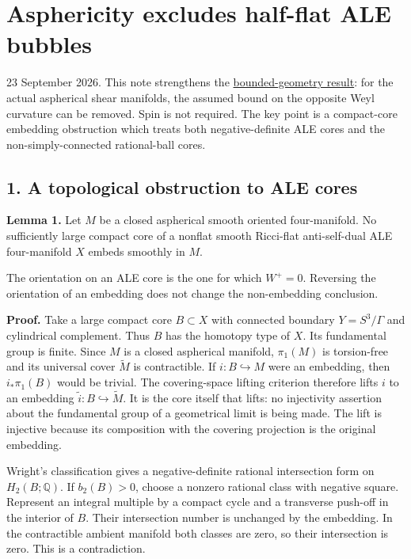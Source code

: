 \documentclass[
  11pt,
]{article}
\author{}
\date{23 September 2026}
\begin{document}
\hypertarget{asphericity-excludes-half-flat-ale-bubbles}{%
\section{Asphericity excludes half-flat ALE
bubbles}\label{asphericity-excludes-half-flat-ale-bubbles}}

23 September 2026. This note strengthens the
\href{line1_allowed_branch_escape.md}{bounded-geometry result}: for the
actual aspherical shear manifolds, the assumed bound on the opposite
Weyl curvature can be removed. Spin is not required. The key point is a
compact-core embedding obstruction which treats both negative-definite
ALE cores and the non-simply-connected rational-ball cores.

\hypertarget{a-topological-obstruction-to-ale-cores}{%
\subsection{1. A topological obstruction to ALE
cores}\label{a-topological-obstruction-to-ale-cores}}

\textbf{Lemma 1.} Let \(M\) be a closed aspherical smooth oriented
four-manifold. No sufficiently large compact core of a nonflat smooth
Ricci-flat anti-self-dual ALE four-manifold \(X\) embeds smoothly in
\(M\).

The orientation on an ALE core is the one for which \(W^+=0\). Reversing
the orientation of an embedding does not change the non-embedding
conclusion.

\textbf{Proof.} Take a large compact core \(B\subset X\) with connected
boundary \(Y=S^3/\Gamma\) and cylindrical complement. Thus \(B\) has the
homotopy type of \(X\). Its fundamental group is finite. Since \(M\) is
a closed aspherical manifold, \(\pi_1(M)\) is torsion-free and its
universal cover \(\widetilde M\) is contractible. If
\(i:B\hookrightarrow M\) were an embedding, then \(i_*\pi_1(B)\) would
be trivial. The covering-space lifting criterion therefore lifts \(i\)
to an embedding \(\widetilde i:B\hookrightarrow\widetilde M\). It is the
core itself that lifts: no injectivity assertion about the fundamental
group of a geometrical limit is being made. The lift is injective
because its composition with the covering projection is the original
embedding.

Wright's classification gives a negative-definite rational intersection
form on \(H_2(B;\mathbb Q)\). If \(b_2(B)>0\), choose a nonzero rational
class with negative square. Represent an integral multiple by a compact
cycle and a transverse push-off in the interior of \(B\). Their
intersection number is unchanged by the embedding. In the contractible
ambient manifold both classes are zero, so their intersection is zero.
This is a contradiction.
\end{document}
